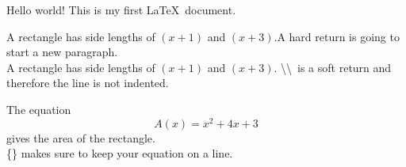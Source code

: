 \documentclass[12pt]{article}
\begin{document}
Hello world! This is my first \LaTeX\ document. 

A rectangle has side lengths of $(x+1)$ and $(x+3)$.A hard return is going to start a new paragraph.\\
A rectangle has side lengths of $(x+1)$ and $(x+3)$. \textbackslash\textbackslash\ is a soft return and therefore the line is not indented.

The equation $${A(x)=x^2+4x+3}$$ gives the area of the rectangle.\\
\{\} makes sure to keep your equation on a line.
\end{document}
